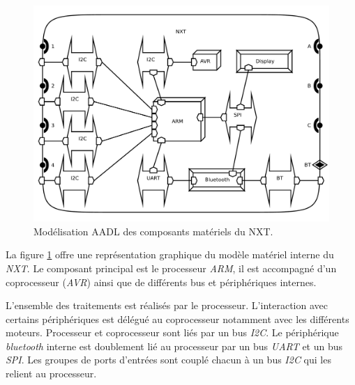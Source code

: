       \begin{figure}[!ht]
        \centering
        \includegraphics[scale=0.25]{./img/aadl-nxt1h.pdf}
        \caption{Modélisation AADL des composants matériels du NXT.}
        \label{fig:aadl-nxt1h}
      \end{figure}

      La figure \ref{fig:aadl-nxt1h} offre une représentation graphique du
      modèle matériel interne du {\it NXT}. Le composant principal est le
      processeur {\it ARM}, il est accompagné d'un coprocesseur ({\it AVR})
      ainsi que de différents bus et périphériques internes.

      L'ensemble des traitements est réalisés par le processeur. L'interaction
      avec certains périphériques est délégué au coprocesseur notamment avec les
      différents moteurs. Processeur et coprocesseur sont liés par un bus {\it
        I2C}. Le périphérique {\it bluetooth} interne est doublement lié au
      processeur par un bus {\it UART} et un bus {\it SPI}. Les groupes de
      ports d'entrées sont couplé chacun à un bus {\it I2C} qui les relient au
      processeur.

      ~

